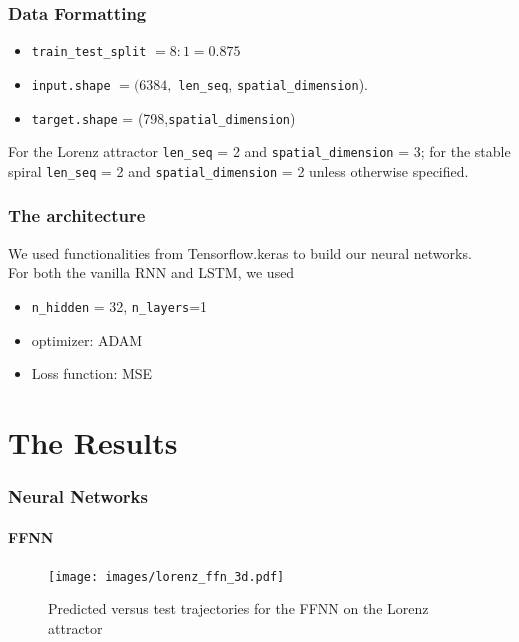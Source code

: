 \documentclass{beamer}
\begin{document}
\begin{frame}[t]
	\frametitle{Data Formatting}

	\begin{itemize}
		\item \texttt{train\_test\_split} $= 8:1 = 0.875$
		\item \texttt{input.shape} $ =(6384,$ \texttt{len\_seq}, \texttt{spatial\_dimension}). \\
		\item \texttt{target.shape} = (798,\texttt{spatial\_dimension})
	\end{itemize}
	For the Lorenz attractor \texttt{len\_seq} = 2 and \texttt{spatial\_dimension} = 3; for the stable spiral \texttt{len\_seq} = 2 and \texttt{spatial\_dimension} = 2 unless otherwise specified.

	
\end{frame}

\begin{frame}[t]
	\frametitle{The architecture}
	
We used functionalities from Tensorflow.keras to build our neural networks. \\
For both the vanilla RNN and LSTM, we used 
\begin{itemize}
	\item \texttt{n\_hidden} = 32, \texttt{n\_layers}=1
	\item optimizer: ADAM
	\item Loss function: MSE
\end{itemize}
\end{frame}

\section{The Results}

\begin{frame}[t]
	\frametitle{Neural Networks}
	\framesubtitle{FFNN}
	\begin{figure}[htpb]
		\centering
	      \texttt{[image: images/lorenz\_ffn\_3d.pdf]}
	      \caption{Predicted versus test trajectories for the FFNN on the Lorenz attractor}
	      \label{fig:ffnn-3d}
	\end{figure}
	
\end{frame}
\end{document}
